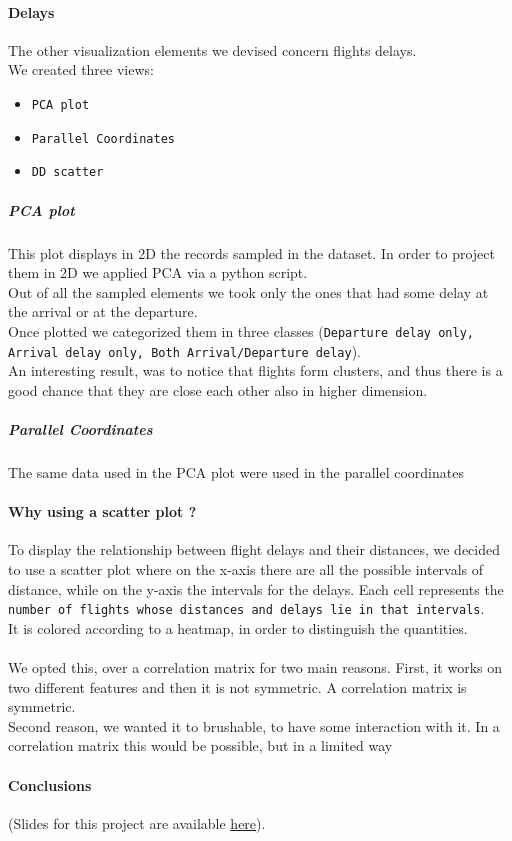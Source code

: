\documentclass[a4paper, 12pt]{article}
\begin{document}
\paragraph*{Delays}
The other visualization elements we devised concern flights delays.\\
We created three views:
\begin{itemize}
\item \texttt{PCA plot}
\item \texttt{Parallel Coordinates}
\item \texttt{DD scatter}
\end{itemize}
\subparagraph{PCA plot} This plot displays in 2D the records sampled in the dataset. In order to project them in 2D we applied PCA via a python script.\\
Out of all the sampled elements we took only the ones that had some delay at the arrival or at the departure.\\
Once plotted we categorized them in three classes (\texttt{Departure delay only, Arrival delay only, Both Arrival/Departure delay}).\\
An interesting result, was to notice that flights form clusters, and thus there is a good chance that they are close each other also in higher dimension.
\subparagraph{Parallel Coordinates}The same data used in the PCA plot were used in the parallel coordinates

\paragraph{Why using a scatter plot ?} To display the relationship between flight delays and their distances, we decided to use a scatter plot where on the x-axis there are all the possible intervals of distance, while on the y-axis the intervals for the delays. Each cell represents the \texttt{number of flights whose distances and delays lie in that intervals}.\\
It is colored according to a heatmap, in order to distinguish the quantities.\\ \\
We opted this, over a correlation matrix for two main reasons. First, it works on two different features and then it is not symmetric. A correlation matrix is symmetric.\\
Second reason, we wanted it to brushable, to have some interaction with it. In a correlation matrix this would be possible, but in a limited way



\paragraph*{Conclusions}

(Slides for this project are available \href{https://docs.google.com/presentation/d/1T_p1oarqUuNt5APTaf7IwTJEzUDJC0CoNfJKHdak0so/edit?usp=sharing}{here}).
\end{document}

